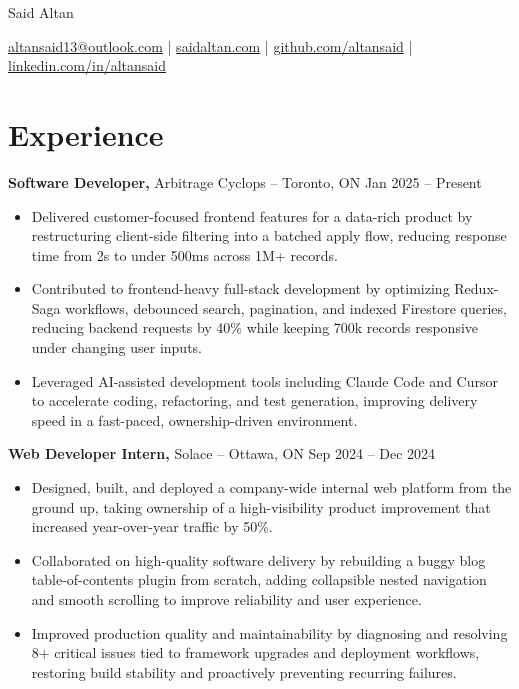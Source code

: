 \documentclass[11pt]{article}       %
\begin{document}
\centerline{\Huge Said Altan}

\vspace{10pt}

\centerline{\href{mailto:altansaid13@outlook.com}{altansaid13@outlook.com} | \href{https://saidaltan.com}{saidaltan.com} | \href{https://github.com/altansaid}{github.com/altansaid} | \href{https://www.linkedin.com/in/altansaid}{linkedin.com/in/altansaid}}


\vspace{5pt}
\section*{Experience}
\textbf{Software Developer,} {Arbitrage Cyclops} -- Toronto, ON \hfill Jan 2025 -- Present \\
\vspace{-9pt}
\begin{itemize}
  \item Delivered customer-focused frontend features for a data-rich product by restructuring client-side filtering into a batched apply flow, reducing response time from 2s to under 500ms across 1M+ records.
  \item Contributed to frontend-heavy full-stack development by optimizing Redux-Saga workflows, debounced search, pagination, and indexed Firestore queries, reducing backend requests by 40\% while keeping 700k records responsive under changing user inputs.
  \item Leveraged AI-assisted development tools including Claude Code and Cursor to accelerate coding, refactoring, and test generation, improving delivery speed in a fast-paced, ownership-driven environment.
\end{itemize}

\textbf{Web Developer Intern,} {Solace} -- Ottawa, ON \hfill Sep 2024 -- Dec 2024 \\
\vspace{-9pt}
\begin{itemize}
  \item Designed, built, and deployed a company-wide internal web platform from the ground up, taking ownership of a high-visibility product improvement that increased year-over-year traffic by 50\%.
  \item Collaborated on high-quality software delivery by rebuilding a buggy blog table-of-contents plugin from scratch, adding collapsible nested navigation and smooth scrolling to improve reliability and user experience.
  \item Improved production quality and maintainability by diagnosing and resolving 8+ critical issues tied to framework upgrades and deployment workflows, restoring build stability and proactively preventing recurring failures.
\end{itemize}
\end{document}
